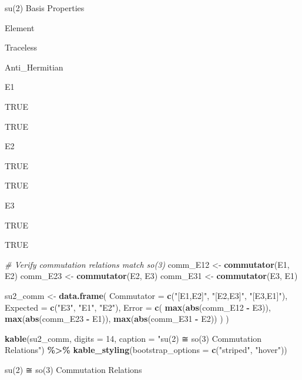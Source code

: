 \documentclass[
]{book}
\newenvironment{Shaded}{\begin{snugshade}}{\end{snugshade}}
\newcommand{\AttributeTok}[1]{\textcolor[rgb]{0.13,0.29,0.53}{#1}}
\newcommand{\CommentTok}[1]{\textcolor[rgb]{0.56,0.35,0.01}{\textit{#1}}}
\newcommand{\DecValTok}[1]{\textcolor[rgb]{0.00,0.00,0.81}{#1}}
\newcommand{\FunctionTok}[1]{\textcolor[rgb]{0.13,0.29,0.53}{\textbf{#1}}}
\newcommand{\NormalTok}[1]{#1}
\newcommand{\OtherTok}[1]{\textcolor[rgb]{0.56,0.35,0.01}{#1}}
\newcommand{\SpecialCharTok}[1]{\textcolor[rgb]{0.81,0.36,0.00}{\textbf{#1}}}
\newcommand{\StringTok}[1]{\textcolor[rgb]{0.31,0.60,0.02}{#1}}
\theoremstyle{definition}
\theoremstyle{definition}
\theoremstyle{definition}
\theoremstyle{definition}
\theoremstyle{remark}
\begin{document}
\label{tab:su2-basis}su(2) Basis Properties

Element

Traceless

Anti\_Hermitian

E1

TRUE

TRUE

E2

TRUE

TRUE

E3

TRUE

TRUE

\begin{Shaded}
\begin{Highlighting}[]
\CommentTok{\# Verify commutation relations match so(3)}
\NormalTok{comm\_E12 }\OtherTok{\textless{}{-}} \FunctionTok{commutator}\NormalTok{(E1, E2)}
\NormalTok{comm\_E23 }\OtherTok{\textless{}{-}} \FunctionTok{commutator}\NormalTok{(E2, E3)}
\NormalTok{comm\_E31 }\OtherTok{\textless{}{-}} \FunctionTok{commutator}\NormalTok{(E3, E1)}

\NormalTok{su2\_comm }\OtherTok{\textless{}{-}} \FunctionTok{data.frame}\NormalTok{(}
  \AttributeTok{Commutator =} \FunctionTok{c}\NormalTok{(}\StringTok{"[E1,E2]"}\NormalTok{, }\StringTok{"[E2,E3]"}\NormalTok{, }\StringTok{"[E3,E1]"}\NormalTok{),}
  \AttributeTok{Expected =} \FunctionTok{c}\NormalTok{(}\StringTok{"E3"}\NormalTok{, }\StringTok{"E1"}\NormalTok{, }\StringTok{"E2"}\NormalTok{),}
  \AttributeTok{Error =} \FunctionTok{c}\NormalTok{(}
    \FunctionTok{max}\NormalTok{(}\FunctionTok{abs}\NormalTok{(comm\_E12 }\SpecialCharTok{{-}}\NormalTok{ E3)),}
    \FunctionTok{max}\NormalTok{(}\FunctionTok{abs}\NormalTok{(comm\_E23 }\SpecialCharTok{{-}}\NormalTok{ E1)),}
    \FunctionTok{max}\NormalTok{(}\FunctionTok{abs}\NormalTok{(comm\_E31 }\SpecialCharTok{{-}}\NormalTok{ E2))}
\NormalTok{  )}
\NormalTok{)}

\FunctionTok{kable}\NormalTok{(su2\_comm,}
      \AttributeTok{digits =} \DecValTok{14}\NormalTok{,}
      \AttributeTok{caption =} \StringTok{"su(2) ≅ so(3) Commutation Relations"}\NormalTok{) }\SpecialCharTok{\%\textgreater{}\%}
  \FunctionTok{kable\_styling}\NormalTok{(}\AttributeTok{bootstrap\_options =} \FunctionTok{c}\NormalTok{(}\StringTok{"striped"}\NormalTok{, }\StringTok{"hover"}\NormalTok{))}
\end{Highlighting}
\end{Shaded}

\label{tab:su2-basis}su(2) ≅ so(3) Commutation Relations
\end{document}
